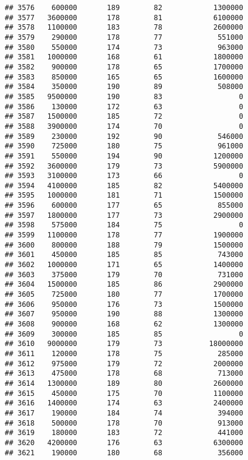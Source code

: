 \documentclass[
]{article}
\begin{document}
\begin{verbatim}
## 3576    600000       189        82            1300000
## 3577   3600000       178        81            6100000
## 3578   1100000       183        78            2600000
## 3579    290000       178        77             551000
## 3580    550000       174        73             963000
## 3581   1000000       168        61            1800000
## 3582    900000       178        65            1700000
## 3583    850000       165        65            1600000
## 3584    350000       190        89             508000
## 3585   9500000       190        83                  0
## 3586    130000       172        63                  0
## 3587   1500000       185        72                  0
## 3588   3900000       174        70                  0
## 3589    230000       192        90             546000
## 3590    725000       180        75             961000
## 3591    550000       194        90            1200000
## 3592   3600000       179        73            5900000
## 3593   3100000       173        66                  0
## 3594   4100000       185        82            5400000
## 3595   1000000       181        71            1500000
## 3596    600000       177        65             855000
## 3597   1800000       177        73            2900000
## 3598    575000       184        75                  0
## 3599   1100000       178        77            1900000
## 3600    800000       188        79            1500000
## 3601    450000       185        85             743000
## 3602   1000000       171        65            1400000
## 3603    375000       179        70             731000
## 3604   1500000       185        86            2900000
## 3605    725000       180        77            1700000
## 3606    950000       176        73            1500000
## 3607    950000       190        88            1300000
## 3608    900000       168        62            1300000
## 3609    300000       185        85                  0
## 3610   9000000       179        73           18000000
## 3611    120000       178        75             285000
## 3612    975000       179        72            2000000
## 3613    475000       178        68             713000
## 3614   1300000       189        80            2600000
## 3615    450000       175        70            1100000
## 3616   1400000       174        63            2400000
## 3617    190000       184        74             394000
## 3618    500000       178        70             913000
## 3619    180000       183        72             441000
## 3620   4200000       176        63            6300000
## 3621    190000       180        68             356000

\end{verbatim}
\end{document}
